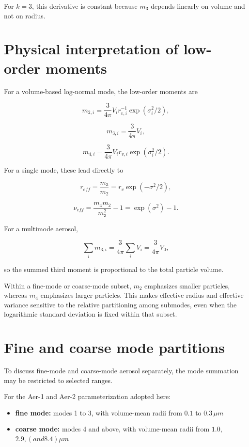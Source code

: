 \documentclass[
  letterpaper,
]{scrbook}
\providecommand{\tightlist}{%
  \setlength{\itemsep}{0pt}\setlength{\parskip}{0pt}}
\begin{document}
For \(k=3\), this derivative is constant because \(m_3\) depends
linearly on volume and not on radius.

\section{Physical interpretation of low-order
moments}\label{physical-interpretation-of-low-order-moments}

For a volume-based log-normal mode, the low-order moments are

\[
m_{2,i}=\frac{3}{4\pi} V_i r_{v,i}^{-1} \exp(\sigma_i^2/2),
\]

\[
m_{3,i}=\frac{3}{4\pi} V_i,
\]

\[
m_{4,i}=\frac{3}{4\pi} V_i r_{v,i} \exp(\sigma_i^2/2).
\]

For a single mode, these lead directly to

\[
r_{eff}=\frac{m_3}{m_2}=r_v \exp(-\sigma^2/2),
\]

\[
\nu_{eff}=\frac{m_4 m_2}{m_3^2}-1=\exp (\sigma^2)-1.
\]

For a multimode aerosol,

\[
\sum_i m_{3,i}=\frac{3}{4\pi}\sum_i V_i=\frac{3}{4\pi} V_0,
\]

so the summed third moment is proportional to the total particle volume.

Within a fine-mode or coarse-mode subset, \(m_2\) emphasizes smaller
particles, whereas \(m_4\) emphasizes larger particles. This makes
effective radius and effective variance sensitive to the relative
partitioning among submodes, even when the logarithmic standard
deviation is fixed within that subset.

\section{Fine and coarse mode
partitions}\label{fine-and-coarse-mode-partitions}

To discuss fine-mode and coarse-mode aerosol separately, the mode
summation may be restricted to selected ranges.

For the Aer-1 and Aer-2 parameterization adopted here:

\begin{itemize}
\tightlist
\item
  \textbf{fine mode:} modes 1 to 3, with volume-mean radii from \(0.1\)
  to \(0.3 \, \mu m\)
\item
  \textbf{coarse mode:} modes 4 and above, with volume-mean radii from
  \(1.0\), \(2.9, (and 8.4) \mu m\)
\end{itemize}
\end{document}
